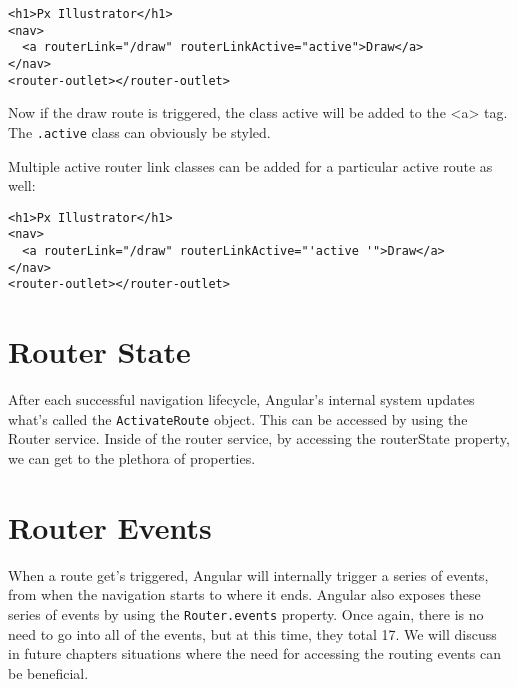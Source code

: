 \begin{lstlisting}
<h1>Px Illustrator</h1>
<nav>
  <a routerLink="/draw" routerLinkActive="active">Draw</a>
</nav>
<router-outlet></router-outlet>
\end{lstlisting}

Now if the draw route is triggered, the class active will 
be added to the <a> tag. The \lstinline{.active} class 
can obviously be styled.

Multiple active router link classes can be added for a 
particular active route as well: 

\begin{lstlisting}
<h1>Px Illustrator</h1>
<nav>
  <a routerLink="/draw" routerLinkActive="'active '">Draw</a>
</nav>
<router-outlet></router-outlet>
\end{lstlisting}

\section{ Router State }
After each successful navigation lifecycle, Angular's internal system 
updates what's called the \lstinline{ActivateRoute} object. This can be
accessed by using the Router service. Inside of the router service, by 
accessing the routerState property, we can get to the plethora of 
properties.


\section{ Router Events }
When a route get's triggered, Angular will internally trigger a series 
of events, from when the navigation starts to where it ends. Angular 
also exposes these series of events by using the \lstinline{Router.events}
property. Once again, there is no need to go into all of the events, but 
at this time, they total 17. We will discuss in future chapters situations 
where the need for accessing the routing events can be beneficial. 
